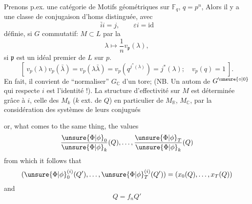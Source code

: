 Prenons p.ex. une catégorie de Motifs géométriques sur $\mathbb F_q$, $q=p^n$,  Alors  il y a une classe de conjugaison d'homs
distinguée, avec
\[
\bar i i=j,\qquad\varepsilon i=\mathrm{id}
\]
définie,  si $G$ commutatif: $M\subset L$  par la
\[
\lambda\longmapsto\frac1n v_{\mathfrak p}(\lambda),
\]
si $\mathfrak p$ est un idéal premier de $L$ sur $p$.
\[
[\ v_p(\lambda)v_p(\bar\lambda)=v_p(\lambda\bar\lambda)=v_p(q^{j^*(\lambda)})=j^*(\lambda);\quad v_p(q)=1\ ].
\]
En fait, il convient de ``normaliser'' $G_{\mathbb C}$   d'un tore; (NB. Un autom de $G^{\unsure{\circ|0}}$ qui  respecte $i$ est l'identité !). La structure d'effectivité sur $M$ est déterminée grâce à $i$, celle des $M_k$ ($k$ ext. de $Q$) en particulier de $M_{\mathbb R}$, $M_{\mathbb C}$, par la considération des systèmes de leurs conjugués

or, what comes to the same thing, the values
\[
\frac{\unsure{\Phi|\phi}_0}{\unsure{\Phi|\phi}_k}(Q),\ldots,\frac{\unsure{\Phi|\phi}_T}{\unsure{\Phi|\phi}_k}(Q)
\]
from which it follows that
\[
(\unsure{\Phi|\phi}_0^{(i)}(Q'),\ldots,\unsure{\Phi|\phi}_T^{(i)}(Q'))=(x_0(Q),\ldots,x_T(Q))
\]
 and
\[
Q=f_nQ'
\]

